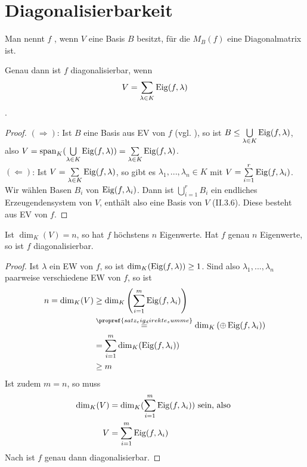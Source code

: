 \section{Diagonalisierbarkeit}

\begin{definition}[diagonalisierbar]
	Man nennt $f$ , wenn $V$ eine Basis $B$ besitzt, für die $M_B(f)$ eine Diagonalmatrix ist.
\end{definition}

\begin{lemma}
	Genau dann ist $f$ diagonalisierbar, wenn
	\begin{align}
		V=\sum\limits_{\lambda\in K} \operatorname{Eig}(f,\lambda) \notag
	\end{align}.
\end{lemma}
\begin{proof}
	$(\Rightarrow)$: Ist $B$ eine Basis aus EV von $f$ (vgl. ), so ist $B\le \bigcup\limits_{\lambda\in K}\operatorname{Eig}(f,\lambda)$, also $V=\operatorname{span}_K(\bigcup\limits_{\lambda\in K}\operatorname{Eig}(f, \lambda))=\sum\limits_{\lambda\in K}\operatorname{Eig}(f,\lambda)$. \\
	$(\Leftarrow)$: Ist $V=\sum\limits_{\lambda\in K}\operatorname{Eig}(f,\lambda)$, so gibt es $\lambda_1,...,\lambda_n \in K$ mit $V=\sum\limits_{i=1}^r \operatorname{Eig}(f,\lambda_i)$. Wir wählen Basen $B_i$ von $\operatorname{Eig}(f,\lambda_i)$. Dann ist $\bigcup\limits_{i=1}^r B_i$ ein endliches Erzeugendensystem von $V$, enthält also eine Basis von $V$ (II.3.6). Diese besteht aus EV von $f$. %
\end{proof}

\begin{proposition}
	Ist $\dim_K(V)=n$, so hat $f$ höchstens $n$ Eigenwerte. Hat $f$ genau $n$ Eigenwerte, so ist $f$ diagonalisierbar.
\end{proposition}
\begin{proof}
	Ist $\lambda$ ein EW von $f$, so ist $\dim_K(\operatorname{Eig}(f,\lambda))\ge 1$. Sind also $\lambda_1,...,\lambda_n$ paarweise verschiedene EW von $f$, so ist
	\begin{align}
		n=\dim_K(V)&\ge \dim_K\left( \sum\limits_{i=1}^m \Eig(f,\lambda_i)\right) \notag \\
		&\overset{\propref{satz_eig_direkte_summe}}{=} \dim_K\left( \oplus \Eig(f,\lambda_i)\right) \notag \\
		&= \sum\limits_{i=1}^m \dim_K(\Eig(f,\lambda_i)) \notag \\
		&\ge m \notag
	\end{align}
	Ist zudem $m=n$, so muss 
	\begin{align}
		\dim_K(V) &= \dim_K(\sum\limits_{i=1}^m \operatorname{Eig}(f,\lambda_i))\text{ sein, also }\notag \\
		V&= \sum\limits_{i=1}^m \operatorname{Eig}(f,\lambda_i) \notag
	\end{align}
	Nach  ist $f$ genau dann diagonalisierbar.
\end{proof}

